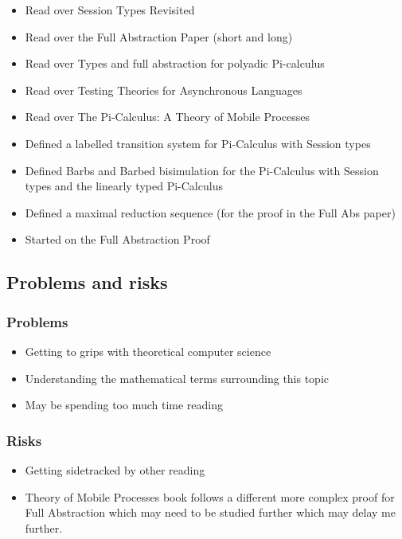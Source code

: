 \documentclass[11pt]{article}
\begin{document}
\begin{itemize}
    \setlength{\itemsep}{0pt}
    \setlength{\parskip}{0pt}
\item Read over Session Types Revisited
\item Read over the Full Abstraction Paper (short and long)
\item Read over Types and full abstraction for polyadic Pi-calculus
\item Read over Testing Theories for Asynchronous Languages
\item Read over The Pi-Calculus: A Theory of Mobile Processes
\item Defined a labelled transition system for Pi-Calculus with Session types
\item Defined Barbs and Barbed bisimulation for the Pi-Calculus with Session types and the linearly typed Pi-Calculus
\item Defined a maximal reduction sequence (for the proof in the Full Abs paper)
\item Started on the Full Abstraction Proof

\end{itemize}

\subsection{Problems and risks}\label{problems-and-risks}

\subsubsection{Problems}\label{problems}

\begin{itemize}
    \setlength{\itemsep}{0pt}
    \setlength{\parskip}{0pt}
\item Getting to grips with theoretical computer science
\item Understanding the mathematical terms surrounding this topic
\item May be spending too much time reading
\end{itemize}


\subsubsection{Risks}\label{risks}

\begin{itemize}
    \setlength{\itemsep}{0pt}
    \setlength{\parskip}{0pt}
\item Getting sidetracked by other reading
\item Theory of Mobile Processes book follows a different more complex proof for Full Abstraction which may need to be studied further which may delay me further.
\end{itemize}
\end{document}
